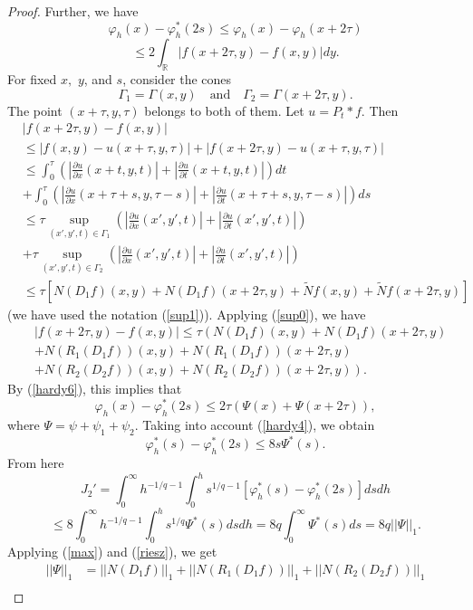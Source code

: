\documentclass[12pt,twoside,reqno]{amsart}
\numberwithin{equation}{section}
\theoremstyle{definition}
\numberwithin{equation}{section}
\def\R{\mathbb{R}}
\def\f{\varphi}
\begin{document}
\begin{proof}
Further, we have
$$
\f_h(x)-\f_h^*(2s)\le \f_h(x)-\f_h(x+2\tau)
$$
\begin{equation}\label{hardy6}
\le 2 \int_\R|f(x+2\tau,y)-f(x,y)|dy.
\end{equation}
For fixed $x,$  $y$, and $s$,  consider the cones
$$
\Gamma_1=\Gamma(x,y)\quad\mbox{and}\quad \Gamma_2=\Gamma(x+2\tau,y).
$$
The point $(x+\tau,y,\tau)$ belongs to  both of them. Let $u=P_t\ast f.$ Then
$$
\begin{aligned}
&|f(x+2\tau,y)-f(x,y)|\\
&\le |f(x,y)-u(x+\tau,y,\tau)|+|f(x+2\tau,y)-u(x+\tau,y,\tau)|\\
&\le \int_0^\tau\left(\left|\frac{\partial u}{\partial x}(x+t,y,t)\right|+\left|\frac{\partial u}{\partial t}(x+t,y,t)\right|\right)dt\\
&+\int_0^\tau\left(\left|\frac{\partial u}{\partial x}(x+\tau+s,y,\tau-s)\right|+\left|\frac{\partial u}{\partial t}(x+\tau+s,y,\tau-s)\right|\right)ds\\
&\le \tau\sup_{(x',y',t)\in \Gamma_1}\left(\left|\frac{\partial u}{\partial x}(x',y',t)\right|+\left|\frac{\partial u}{\partial t}(x',y',t)\right|\right)\\
&+\tau\sup_{(x',y',t)\in \Gamma_2}\left(\left|\frac{\partial u}{\partial x}(x',y',t)\right|+\left|\frac{\partial u}{\partial t}(x',y',t)\right|\right)\\
&\le\tau\left[N(D_1f)(x,y)+N(D_1f)(x+2\tau,y)+\widetilde{N}f(x,y)+\widetilde{N}f(x+2\tau,y)\right]
\end{aligned}
$$
(we have used the notation (\ref{sup1})). Applying  (\ref{sup0}), we have
$$
\begin{aligned}
&|f(x+2\tau,y)-f(x,y)|\le \tau\left(N(D_1f)(x,y) + N(D_1f)(x+2\tau,y)\right.\\
&\left.+N(R_1(D_1f))(x,y)+N(R_1(D_1f))(x+2\tau,y)\right.\\
&\left.+N(R_2(D_2f))(x,y)+N(R_2(D_2f))(x+2\tau,y)\right).
\end{aligned}
$$
By (\ref{hardy6}), this implies that
$$
\f_h(x)-\f_h^*(2s)
\le 2\tau(\Psi(x)+\Psi(x+2\tau)),
$$
where $\Psi=\psi+\psi_1+\psi_2.$ Taking into account (\ref{hardy4}), we obtain
$$
\f_h^*(s)-\f_h^*(2s)\le 8s\Psi^*(s).
$$
From here
$$
J_2'= \int_0^\infty h^{-1/q-1}\int_0^h s^{1/q-1}[\f_h^*(s)-\f_h^*(2s)]dsdh
$$
$$
\le 8\int_0^\infty h^{-1/q-1}\int_0^h s^{1/q}\Psi^*(s)dsdh=8q\int_0^\infty \Psi^*(s)ds=8q||\Psi||_1.
$$
Applying (\ref{max}) and (\ref{riesz}), we get
$$
\begin{aligned}
||\Psi||_1&=||N(D_1f)||_1+||N(R_1(D_1f))||_1+||N(R_2(D_2f))||_1\\

\end{aligned}$$
\end{proof}
\end{document}
